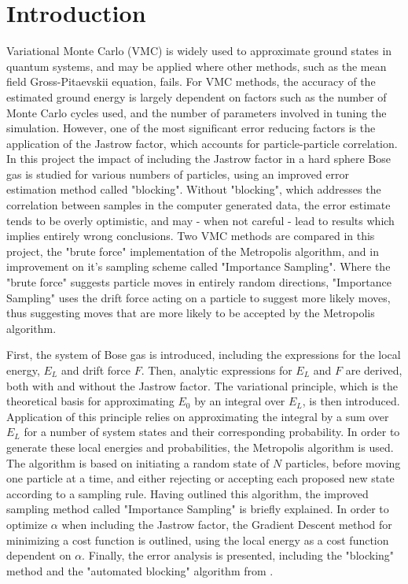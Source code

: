 \documentclass[%
oneside,                 %
final,                   %
10pt]{article}
\begin{document}
\section{Introduction}
Variational Monte Carlo (VMC) is widely used to approximate ground states in quantum systems, and may be applied where other methods, such as the mean field Gross-Pitaevskii equation, fails. For VMC methods, the accuracy of the estimated ground energy is largely dependent on factors such as the number of Monte Carlo cycles used, and the number of parameters involved in tuning the simulation. However, one of the most significant error reducing factors is the application of the Jastrow factor, which accounts for particle-particle correlation. In this project the impact of including the Jastrow factor in a hard sphere Bose gas is studied for various numbers of particles, using an improved error estimation method called "blocking". Without "blocking", which addresses the correlation between samples in the computer generated data, the error estimate tends to be overly optimistic, and may - when not careful - lead to results which implies entirely wrong conclusions. Two VMC methods are compared in this project, the "brute force" implementation of the Metropolis algorithm, and in improvement on it's sampling scheme called "Importance Sampling". Where the "brute force" suggests particle moves in entirely random directions, "Importance Sampling" uses the drift force acting on a particle to suggest more likely moves, thus suggesting moves that are more likely to be accepted by the Metropolis algorithm. 

First, the system of Bose gas is introduced, including the expressions for the local energy, $E_L$ and drift force $F$. Then, analytic expressions for $E_L$ and $F$ are derived, both with and without the Jastrow factor. The variational principle, which is the theoretical basis for approximating $E_0$ by an integral over $E_L$, is then introduced. Application of this principle relies on approximating the integral by a sum over $E_L$ for a number of system states and their corresponding probability. In order to generate these local energies and probabilities, the Metropolis algorithm is used. The algorithm is based on initiating a random state of $N$ particles, before moving one particle at a time, and either rejecting or accepting each proposed new state according to a sampling rule. Having outlined this algorithm, the improved sampling method called "Importance Sampling" is briefly explained. In order to optimize $\alpha$ when including the Jastrow factor, the Gradient Descent method for minimizing a cost function is outlined, using the local energy as a cost function dependent on $\alpha$. Finally, the error analysis is presented, including the "blocking" method and the "automated blocking" algorithm from \citep{Jonsson}.
\end{document}
